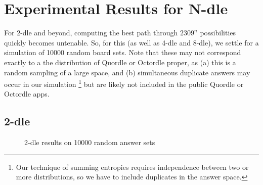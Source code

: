 \documentclass[11pt, oneside]{article} 	%
\begin{document}
\section{Experimental Results for N-dle}
For 2-dle and beyond, computing the best path through $2309^n$ possibilities quickly becomes untenable. So, for this (as well as 4-dle and 8-dle), we settle for a simulation of 10000 random board sets. 
Note that these may not correspond exactly to a the distribution of Quordle or Octordle proper, as (a) this is a random sampling of a large space, and (b) simultaneous duplicate answers may occur in our simulation \footnote{Our technique of summing entropies requires independence between two or more distributions, so we have to include duplicates in the answer space.} but are likely not included in the public Quordle or Octordle apps.


\subsection{2-dle}

\begin{figure}[!htb]
 \centering
 \qquad
 \caption{2-dle results on 10000 random answer sets}%
\end{figure}
\end{document}
